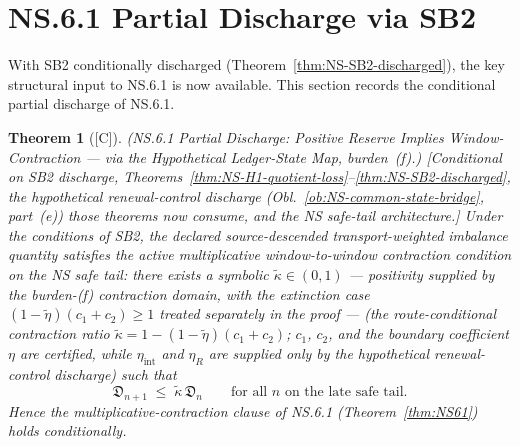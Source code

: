 \documentclass[12pt,oneside]{amsbook}
\theoremstyle{plain}
\newtheorem{theorem}{Theorem}[section]
\theoremstyle{definition}
\theoremstyle{remark}
\newcommand{\status}[1]{\textup{[#1]}}
\begin{document}
\section{NS.6.1 Partial Discharge via SB2}
\label{sec:ns61-partial}

With SB2 conditionally discharged
(Theorem~\ref{thm:NS-SB2-discharged}), the key structural input
to NS.6.1 is now available. This section records the conditional
partial discharge of NS.6.1.

\begin{theorem}[\status{C}]\label{thm:NS61-partial}
\textup{(NS.6.1 Partial Discharge: Positive Reserve Implies
Window-Contraction --- via the Hypothetical Ledger-State Map,
burden~(f).)}
\textup{[Conditional on SB2 discharge,
Theorems~\ref{thm:NS-H1-quotient-loss}--\ref{thm:NS-SB2-discharged},
the hypothetical renewal-control discharge
(Obl.~\ref{ob:NS-common-state-bridge}, part~(e)) those theorems
now consume, and the NS safe-tail architecture.]}
Under the conditions of SB2, the declared source-descended
transport-weighted imbalance quantity satisfies the active
multiplicative window-to-window contraction condition on the NS
safe tail: there exists a symbolic
$\widetilde\kappa \in (0,1)$ --- positivity supplied by the
burden-(f) contraction domain, with the extinction case
$(1-\widetilde\eta)(c_1+c_2) \geq 1$ treated separately in the
proof --- (the route-conditional contraction ratio
$\widetilde\kappa = 1-(1-\widetilde\eta)(c_1+c_2)$; $c_1$,
$c_2$, and the boundary coefficient $\eta$ are certified, while
$\eta_{\mathrm{int}}$ and $\eta_R$ are supplied only by the
hypothetical renewal-control discharge) such that
\[
 \mathfrak{D}_{n+1} \;\leq\; \widetilde\kappa\,\mathfrak{D}_n
 \qquad \text{for all } n \text{ on the late safe tail.}
\]
Hence the multiplicative-contraction clause of NS.6.1
(Theorem~\ref{thm:NS61}) holds conditionally.
\end{theorem}
\end{document}
